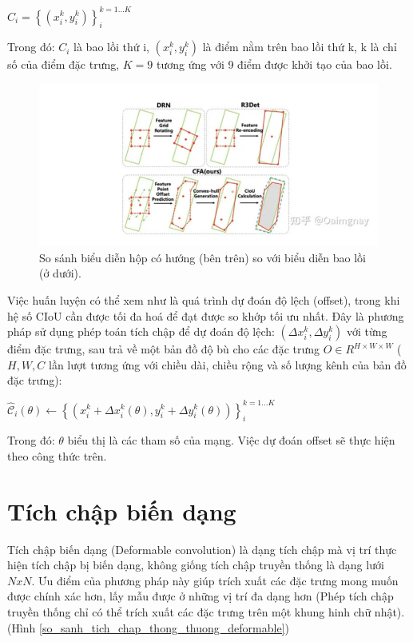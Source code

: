 \documentclass[12pt,a4paper,openany,oneside]{report}
\begin{document}
\begin{center}
	$C_i=\left\{\left(x_i^k, y_i^k\right)\right\}_i^{k=1 \ldots K}$
\end{center}
Trong đó: $C_i$ là bao lồi thứ i, $\left(x_i^k, y_i^k\right)$ là điểm nằm trên bao lồi thứ k, k là chỉ số của điểm đặc trưng, $K = 9$ tương ứng với 9 điểm được khởi tạo của bao lồi.

\begin{figure}[ht!]
	\begin{center}
		\includegraphics[width=445px]{./compare_convex-hull_with_rectangle.jpg}
		\caption{So sánh biểu diễn hộp có hướng (bên trên) so với biểu diễn bao lồi (ở dưới).}
		\label{fig_dhandang1}
	\end{center}
\end{figure} 


Việc huấn luyện có thể xem như là quá trình dự đoán độ lệch (offset), trong khi hệ số CIoU cần được tối đa hoá để đạt được so khớp tối ưu nhất. Đây là phương pháp sử dụng phép toán tích chập để dự đoán độ lệch:
$\left(\Delta x_i^k, \Delta y_i^k\right)$
với từng điểm đặc trưng, sau trả về một bản đồ độ bù cho các đặc trưng
$O \in R^{H \times W \times W}$ ($H, W, C$ lần lượt tương ứng với chiều dài, chiều rộng và số lượng kênh của bản đồ đặc trưng):
\begin{center}
	$\hat{\mathcal{C}}_i(\theta) \leftarrow\left\{\left(x_i^k+\Delta x_i^k(\theta), y_i^k+\Delta y_i^k(\theta)\right)\right\}_i^{k=1 \ldots K}$
\end{center}

Trong đó: $\theta$ biểu thị là các tham số của mạng. Việc dự đoán offset sẽ thực hiện theo công thức trên.

\section{Tích chập biến dạng}
Tích chập biến dạng (Deformable convolution) là dạng tích chập mà vị trí thực hiện tích chập bị biến dạng, không giống tích chập truyền thống là dạng lưới $NxN$. Ưu điểm của phương pháp này giúp trích xuất các đặc trưng mong muốn được chính xác hơn, lấy mẫu được ở những vị trí đa dạng hơn (Phép tích chập truyền thống chỉ có thể trích xuất các đặc trưng trên một khung hinh chữ nhật).(Hình \ref{so_sanh_tich_chap_thong_thuong_deformable})
\end{document}
